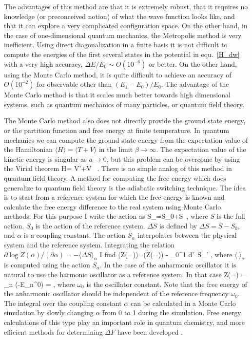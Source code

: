 \vspace*{0.3cm} 
 The advantages of this method are that it is extremely robust, that it 
requires no knowledge (or preconceived notion) of what the wave function 
looks like, and that it can explore a very complicated configuration space.
On the other hand, in the case of one-dimensional quantum mechanics, the 
Metropolis method is very inefficient. Using direct diagonalization in a 
finite basis it is not difficult to compute the energies of the first 
several states in the potential in equ.~\ref{H_dw} with a very high accuracy, 
$\Delta E/E_0 \sim O(10^{-6})$ or better. On the other hand, using the 
Monte Carlo method, it is quite difficult to achieve an accuracy of 
$O(10^{-2})$ for observable other than $(E_1-E_0)/E_0$. The advantage of the 
Monte Carlo method is that it scales much better towards high dimensional
systems, such as quantum mechanics of many particles, or quantum field
theory.

 The Monte Carlo method also does not directly provide the ground state
energy, or the partition function and free energy at finite temperature.
In quantum mechanics we can compute the ground state energy from the 
expectation value of the Hamiltonian $\langle H\rangle = \langle T+V
\rangle$ in the limit $\beta\to\infty$. The expectation value of the kinetic 
energy is singular as $a\to 0$, but this problem can be overcome by using
the Virial theorem
\be 
\langle H\rangle = \left\langle {}V'+V \right\rangle\, . 
\ee
There is no simple analog of this method in quantum field theory. A method 
for computing the free energy which does generalize to quantum field theory
is the adiabatic switching technique. The idea is to start from a reference 
system for which the free energy is known and calculate the free energy 
difference to the real system using Monte Carlo methods. For this purpose 
I write the action as 
\be 
S_\alpha=S_0+\alpha\Delta S\, , 
\ee
where $S$ is the full action, $S_0$ is the action of the reference system, 
$\Delta S$ is defined by $\Delta S=S-S_0$, and $\alpha$ is a coupling 
constant. The action $S_\alpha$ interpolates between the physical system
and the reference system. Integrating the relation $\partial 
\log Z(\alpha)/(\partial\alpha)=-\langle \Delta S \rangle_\alpha$ I find
\be
\label{adiab}
 \log(Z(\alpha\!=))=\log(Z(\alpha\!=)) 
 - \int_0^1 d\alpha'\, \langle \Delta S\rangle_{\alpha'} \;\; ,
\ee
where $\langle .\rangle_\alpha$ is computed using the action $S_\alpha$. In 
the case of the anharmonic oscillator it is natural to use the harmonic 
oscillator as a reference system. In that case
\be 
 Z(\alpha\!=) = \sum_n \exp(-\beta E_n^0) 
  = ,
\ee
where $\omega_0$ is the oscillator constant. Note that the free energy 
of the anharmonic oscillator should be independent of the reference 
frequency $\omega_0$. The integral over the coupling constant $\alpha$ 
can be calculated in a Monte Carlo simulation by slowly changing $\alpha$ 
from 0 to 1 during the simulation. Free energy calculations of this type 
play an important role in quantum chemistry, and more efficient methods
for determining $\Delta F$ have been developed \cite{Jarzynski:1997}.



